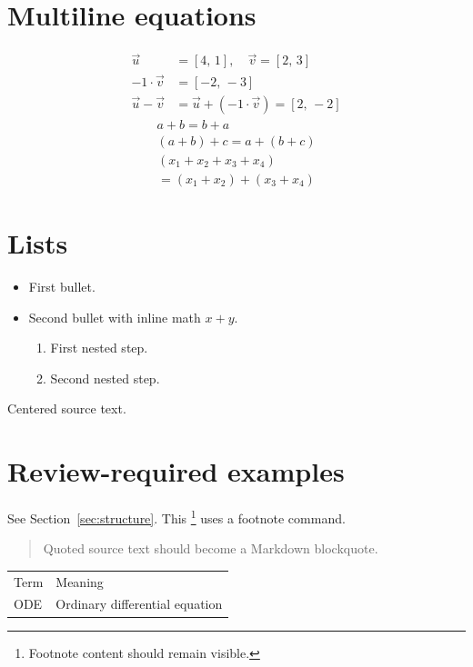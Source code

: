 \documentclass{article}
\begin{document}
\section{Multiline equations}
\begin{align*}
\vec{u} &= [4,\,1], \quad \vec{v}=[2,\,3] \\
-1\cdot\vec{v} &= [-2,\,-3] \\
\vec{u}-\vec{v} &= \vec{u}+(-1\cdot\vec{v})=[2,\,-2]
\end{align*}
\begin{gather*}
a+b=b+a \\
(a+b)+c=a+(b+c)
\end{gather*}
\begin{multline*}
(x_1+x_2+x_3+x_4) \\
= (x_1+x_2)+(x_3+x_4)
\end{multline*}

\section{Lists}
\begin{itemize}
\item First bullet.
\item Second bullet with inline math $x+y$.
  \begin{enumerate}
  \item First nested step.
  \item Second nested step.
  \end{enumerate}
\end{itemize}

\begin{abstract}
This abstract summarizes the formula examples.
\end{abstract}
\begin{center}
Centered source text.
\end{center}

\section{Review-required examples}
See Section~\ref{sec:structure}. This \footnote{Footnote content should remain visible.}
uses a footnote command.
\begin{quote}
Quoted source text should become a Markdown blockquote.
\end{quote}
\begin{tabular}{ll}
Term & Meaning \\
ODE & Ordinary differential equation
\end{tabular}
\end{document}

